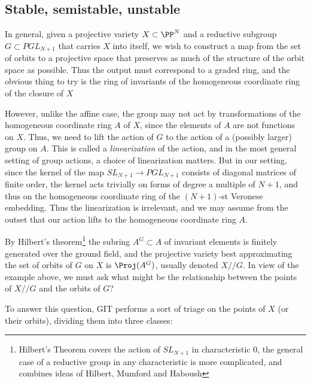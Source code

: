 \subsection{Stable, semistable, unstable}

In general, given a projective variety $X \subset \PP^N$ and a reductive subgroup $G \subset PGL_{N+1}$ that carries $X$ into itself, we wish to construct a map from the set of orbits
to a projective space that preserves as much of the structure of the orbit space as possible. Thus
the output must correspond to a graded ring, and the obvious thing to try is the ring of invariants
of the homogeneous coordinate ring of the closure of $X$

However, unlike the affine case, the group may not act by transformations of the homogeneous coordinate ring $A$ of $X$, since the elements of $A$ are not functions on $X$. Thus, we need to lift the action of 
$G$ to the action of a (possibly larger) group on $A$.  This is called a \emph{linearization} of the action, and in the most general setting of group actions,
a choice of linearization matters.  But in our setting, since the kernel of the map $SL_{N+1} \to PGL_{N+1}$ consists of diagonal matrices of finite order, the kernel acts trivially on forms of degree a multiple
of $N+1$, and thus
on the homogeneous coordinate ring of the $(N+1)$-st Veronese embedding. Thus the linearization is irrelevant, and we may assume from the outset that our action lifts to the homogeneous coordinate ring $A$.

By Hilbert's theorem\footnote{Hilbert's Theorem covers the action of $SL_{N+1}$ in characteristic 0, the general case of a reductive group in any characteristic is more complicated, and combines ideas of 
Hilbert, Mumford and Haboush} the subring $A^G \subset A$ of invariant elements is finitely generated over the ground field, and the projective variety best approximating the set of orbits of $G$ on $X$ 
is $\Proj(A^G)$, usually denoted $X//G$. In view of the example above, we must ask what might be
the relationship between the points of $X//G$ and the orbits of $G$? 

To answer this question, GIT performs a sort of triage on the points of $X$ (or their orbits), dividing them into three classes:

